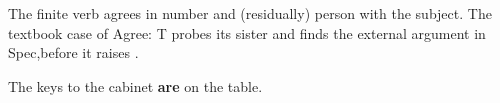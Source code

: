 
The finite verb agrees in number and (residually) person with the subject. The textbook case of Agree: T probes its sister and finds the external argument in Spec,\vP before it raises \citep{chomsky2000}.

\ex The keys to the cabinet \textbf{are} on the table. \xe
